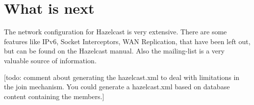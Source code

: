 \section{What is next}
The network configuration for Hazelcast is very extensive. There are some features like IPv6, Socket Interceptors, WAN Replication, that have been left out, but can be found on the Hazelcast manual. Also the mailing-list is a very valuable source of information. 

[todo: comment about generating the hazelcast.xml to deal with limitations in the join mechanism. You could generate
a hazelcast.xml based on database content containing the members.]
